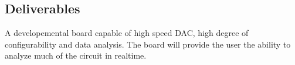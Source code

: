 \subsection{Deliverables}
A developemental board capable of high speed DAC, high degree of configurability and data analysis. The board will provide the user the ability to analyze much of the circuit in realtime. 